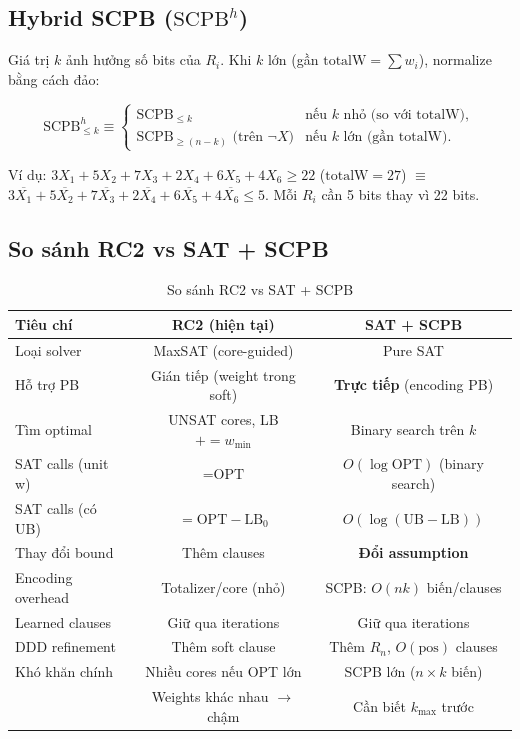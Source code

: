 \documentclass[11pt,a4paper]{article}
\begin{document}
\subsection{Hybrid SCPB ($\text{SCPB}^h$)}

Giá trị $k$ ảnh hưởng số bits của $R_i$. Khi $k$ lớn (gần $\text{totalW} = \sum w_i$), normalize bằng cách đảo:

\[
\text{SCPB}^h_{\leq k} \equiv
\begin{cases}
\text{SCPB}_{\leq k} & \text{nếu } k \text{ nhỏ (so với totalW)},\\
\text{SCPB}_{\geq (n-k)} \text{ (trên } \neg X) & \text{nếu } k \text{ lớn (gần totalW)}.
\end{cases}
\]

Ví dụ: $3X_1 + 5X_2 + 7X_3 + 2X_4 + 6X_5 + 4X_6 \geq 22$ ($\text{totalW} = 27$) $\equiv$ $3\overline{X_1} + 5\overline{X_2} + 7\overline{X_3} + 2\overline{X_4} + 6\overline{X_5} + 4\overline{X_6} \leq 5$. Mỗi $R_i$ cần 5 bits thay vì 22 bits.

\subsection{So sánh RC2 vs SAT + SCPB}

\begin{table}[ht]
\centering
\small
\begin{tabular}{lcc}
\toprule
\textbf{Tiêu chí} & \textbf{RC2 (hiện tại)} & \textbf{SAT + SCPB} \\
\midrule
Loại solver & MaxSAT (core-guided) & Pure SAT \\
Hỗ trợ PB & Gián tiếp (weight trong soft) & \textbf{Trực tiếp} (encoding PB) \\
Tìm optimal & UNSAT cores, LB $+= w_{\min}$ & Binary search trên $k$ \\
\midrule
SAT calls (unit w) & $= \text{OPT}$ & $O(\log \text{OPT})$ (binary search) \\
SAT calls (có UB) & $= \text{OPT} - \text{LB}_0$ & $O(\log(\text{UB}-\text{LB}))$ \\
Thay đổi bound & Thêm clauses & \textbf{Đổi assumption} \\
\midrule
Encoding overhead & Totalizer/core (nhỏ) & SCPB: $O(nk)$ biến/clauses \\
Learned clauses & Giữ qua iterations & Giữ qua iterations \\
DDD refinement & Thêm soft clause & Thêm $R_n$, $O(\text{pos})$ clauses \\
\midrule
Khó khăn chính & Nhiều cores nếu OPT lớn & SCPB lớn ($n \times k$ biến) \\
 & Weights khác nhau $\to$ chậm & Cần biết $k_{\max}$ trước \\
\bottomrule
\end{tabular}
\caption{So sánh RC2 vs SAT + SCPB}
\end{table}
\end{document}
